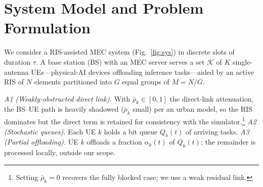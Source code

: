 \documentclass[conference]{IEEEtran}
\begin{document}
\section{System Model and Problem Formulation}\label{sec:model}
We consider a RIS-assisted MEC system (Fig.~\ref{fig:sys}) in discrete slots of
duration $\tau$. A base station (BS) with an MEC server serves a set $\mathcal{K}$
of $K$ single-antenna UEs---physical-AI devices offloading inference tasks---aided
by an active RIS of $N$ elements partitioned into $G$ equal groups of $M=N/G$.

\emph{A1 (Weakly-obstructed direct link).} With $\bar\rho_k\in[0,1]$ the direct-link
attenuation, the BS--UE path is heavily shadowed ($\bar\rho_k$ small) per an urban
model, so the RIS dominates but the direct term is retained for consistency with the
simulator.\footnote{Setting $\bar\rho_k=0$ recovers the fully blocked case; we use a
weak residual link.}
\emph{A2 (Stochastic queues).} Each UE $k$ holds a bit queue $Q_k(t)$ of arriving
tasks. \emph{A3 (Partial offloading).} UE $k$ offloads a fraction $\alpha_k(t)$ of
$Q_k(t)$; the remainder is processed locally, outside our scope.
\end{document}
